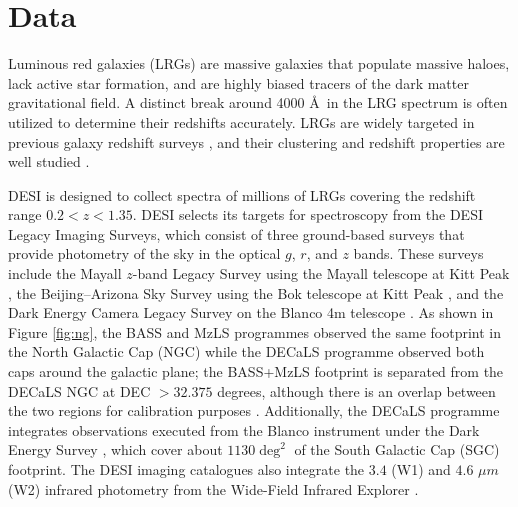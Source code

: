 \section{Data}
\label{sec:data}
Luminous red galaxies (LRGs) are massive galaxies that populate massive haloes, lack active star formation, and are highly biased tracers of the dark matter gravitational field. A distinct break around 4000 \AA~in the LRG spectrum is often utilized to determine their redshifts accurately. LRGs are widely targeted in previous galaxy redshift surveys \citep[see, e.g.,][]{eisenstein2001spectroscopic, prakash2016sdss}, and their clustering and redshift properties are well studied \citep[see, e.g.,][]{ross2020MNRAS.498.2354R, gilmarin2020MNRAS.498.2492G, bautista2021MNRAS.500..736B, chapman2022MNRAS.516..617C}. 

DESI is designed to collect spectra of millions of LRGs covering the redshift range $0.2<z<1.35$. DESI selects its targets for spectroscopy from the DESI Legacy Imaging Surveys, which consist of three ground-based surveys that provide photometry of the sky in the optical $g$, $r$, and $z$ bands. These surveys include the Mayall $z$-band Legacy Survey using the Mayall telescope at Kitt Peak \citep[MzLS;][]{dey2018overview}, the Beijing–Arizona Sky Survey using the Bok telescope at Kitt Peak \citep[BASS;][]{zou2017project}, and the Dark Energy Camera Legacy Survey on the Blanco 4m telescope \citep[DECaLS;][]{flaugher2015dark}. As shown in Figure \ref{fig:ng}, the BASS and MzLS programmes observed the same footprint in the North Galactic Cap (NGC) while the DECaLS programme observed both caps around the galactic plane; the BASS+MzLS footprint is separated from the DECaLS NGC at DEC $> 32.375$ degrees, although there is an overlap between the two regions for calibration purposes \citep{dey2018overview}. Additionally, the DECaLS programme integrates observations executed from the Blanco instrument under the Dark Energy Survey \citep{abbott2016dark}, which cover about $1130 \deg^{2}$ of the South Galactic Cap (SGC) footprint. The DESI imaging catalogues also integrate the $3.4$ (W1) and $4.6$ $\mu m$ (W2) infrared photometry from the Wide-Field Infrared Explorer \citep[WISE;][]{wise2010AJ....140.1868W, meisner2018RNAAS...2....1M}.  


